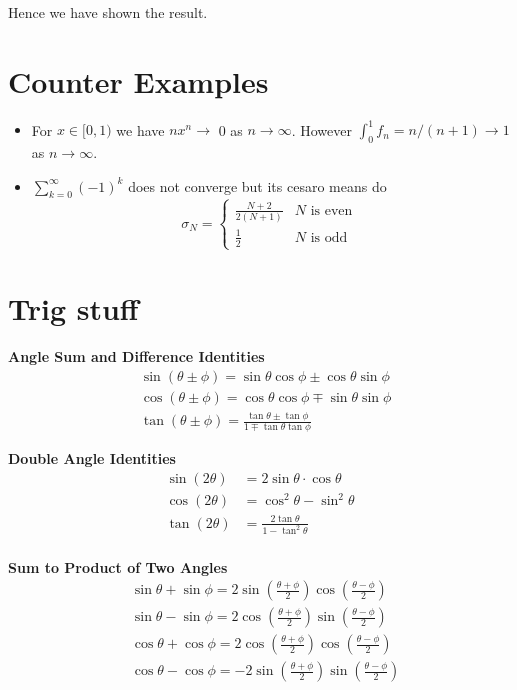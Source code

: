 \documentclass[a4paper, 10pt]{article}
\begin{document}
\begin{multicols*}{3}
Hence we have shown the result.

\section*{Counter Examples}
\begin{itemize}[label=\textbullet, labelsep=0.3em, leftmargin=1em]
\item For $x\in[0,1)$ we have $n x^n \rightarrow$ 0 as $n \rightarrow \infty$. However $\int_0^1 f_n=n /(n+1) \rightarrow 1$ as $n \rightarrow \infty$.
	\item $\sum_{k=0}^{\infty}(-1)^k$ does not converge but its cesaro means do
	$$\sigma_N= \begin{cases}\frac{N+2}{2(N+1)} & N \text { is even } \\ \frac{1}{2} & N \text { is odd }\end{cases}$$
\end{itemize}

\section*{Trig stuff}
\textbf{Angle Sum and Difference Identities}
\begin{align*}
	& \sin (\theta \pm \phi)=\sin \theta \cos \phi \pm \cos \theta \sin \phi \\
	& \cos (\theta \pm \phi)=\cos \theta \cos \phi \mp \sin \theta \sin \phi \\
	& \tan (\theta \pm \phi)=\frac{\tan \theta \pm \tan \phi}{1 \mp \tan \theta \tan \phi}
\end{align*}

\textbf{Double Angle Identities}
\begin{align*}
    \sin(2\theta) &= 2 \sin \theta \cdot \cos \theta \\
    \cos(2\theta) &= \cos^2 \theta - \sin^2 \theta \\
    \tan(2\theta) &= \frac{2 \tan \theta}{1 - \tan^2 \theta} \\
\end{align*}

\textbf{Sum to Product of Two Angles}		
$$
\begin{aligned}
& \sin \theta+\sin \phi=2 \sin \left(\frac{\theta+\phi}{2}\right) \cos \left(\frac{\theta-\phi}{2}\right) \\
& \sin \theta-\sin \phi=2 \cos \left(\frac{\theta+\phi}{2}\right) \sin \left(\frac{\theta-\phi}{2}\right) \\
& \cos \theta+\cos \phi=2 \cos \left(\frac{\theta+\phi}{2}\right) \cos \left(\frac{\theta-\phi}{2}\right) \\
& \cos \theta-\cos \phi=-2 \sin \left(\frac{\theta+\phi}{2}\right) \sin \left(\frac{\theta-\phi}{2}\right)
\end{aligned}
$$


\end{multicols*}
\end{document}
